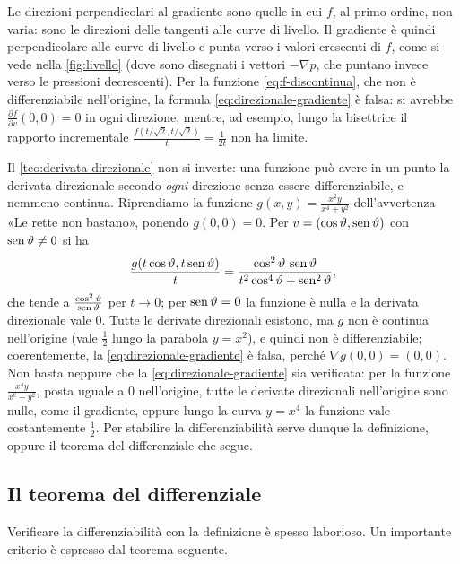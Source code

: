 Le direzioni perpendicolari al gradiente sono quelle in cui $f$, al primo ordine, non
varia: sono le direzioni delle tangenti alle curve di livello. Il gradiente è quindi
perpendicolare alle curve di livello e punta verso i valori crescenti di $f$, come si
vede nella \cref{fig:livello} (dove sono disegnati i vettori $-\nabla p$, che puntano
invece verso le pressioni decrescenti). Per la funzione \eqref{eq:f-discontinua}, che non è
differenziabile nell'origine, la formula \eqref{eq:direzionale-gradiente} è falsa: si
avrebbe $\frac{\partial f}{\partial v}(0,0)=0$ in ogni direzione, mentre, ad esempio, lungo
la bisettrice il rapporto incrementale $\frac{f(t/\sqrt2,t/\sqrt2)}{t}=\frac1{2t}$ non ha
limite.

\begin{attenzione}
Il \cref{teo:derivata-direzionale} non si inverte: una funzione può avere in un punto la
derivata direzionale secondo \emph{ogni} direzione senza essere differenziabile, e
nemmeno continua. Riprendiamo la funzione $g(x,y)=\frac{x^{2}y}{x^{4}+y^{2}}$
dell'avvertenza «Le rette non bastano», ponendo $g(0,0)=0$. Per
$v=(\cos\vartheta,\operatorname{sen}\vartheta)$ con $\operatorname{sen}\vartheta\neq0$ si ha
\[
  \frac{g(t\cos\vartheta,t\operatorname{sen}\vartheta)}{t}
  =\frac{\cos^{2}\vartheta\,\operatorname{sen}\vartheta}{t^{2}\cos^{4}\vartheta+\operatorname{sen}^{2}\vartheta},
\]
che tende a $\frac{\cos^{2}\vartheta}{\operatorname{sen}\vartheta}$ per $t\to0$; per $\operatorname{sen}\vartheta=0$
la funzione è nulla e la derivata direzionale vale $0$. Tutte le derivate direzionali
esistono, ma $g$ non è continua nell'origine (vale $\frac12$ lungo la parabola $y=x^{2}$),
e quindi non è differenziabile; coerentemente, la \eqref{eq:direzionale-gradiente} è
falsa, perché $\nabla g(0,0)=(0,0)$. Non basta neppure che la
\eqref{eq:direzionale-gradiente} sia verificata: per la funzione
$\frac{x^{4}y}{x^{8}+y^{2}}$, posta uguale a $0$ nell'origine, tutte le derivate
direzionali nell'origine sono nulle, come il gradiente, eppure lungo la curva $y=x^{4}$
la funzione vale costantemente $\frac12$. Per stabilire la differenziabilità serve
dunque la definizione, oppure il teorema del differenziale che segue.
\end{attenzione}

\subsection{Il teorema del differenziale}

Verificare la differenziabilità con la definizione è spesso laborioso. Un importante
criterio è espresso dal teorema seguente.

